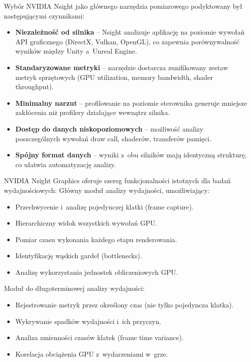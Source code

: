 Wybór NVIDIA Nsight jako głównego narzędzia pomiarowego podyktowany
był następującymi czynnikami:

\begin{itemize}
    \item \textbf{Niezależność od silnika} -- Nsight analizuje aplikację na poziomie wywołań API graficznego (DirectX, Vulkan, OpenGL), co zapewnia porównywalność wyników między Unity a~Unreal Engine.
    \item \textbf{Standaryzowane metryki} -- narzędzie dostarcza zunifikowany zestaw metryk sprzętowych (GPU utilization, memory bandwidth, shader throughput).
    \item \textbf{Minimalny narzut} -- profilowanie na poziomie sterownika generuje mniejsze zakłócenia niż profilery działające wewnątrz silnika.
    \item \textbf{Dostęp do danych niskopoziomowych} -- możliwość analizy poszczególnych wywołań draw call, shaderów, transferów pamięci.
    \item \textbf{Spójny format danych} -- wyniki z~obu silników mają identyczną strukturę, co ułatwia automatyzację analizy.
\end{itemize}


NVIDIA Nsight Graphics oferuje szereg funkcjonalności istotnych dla badań wydajnościowych:
Główny moduł analizy wydajności, umożliwiający:
\begin{itemize}
    \item Przechwycenie i~analizę pojedynczej klatki (frame capture).
    \item Hierarchiczny widok wszystkich wywołań GPU.
    \item Pomiar czasu wykonania każdego etapu renderowania.
    \item Identyfikację wąskich gardeł (bottlenecks).
    \item Analizę wykorzystania jednostek obliczeniowych GPU.
\end{itemize}

Moduł do długoterminowej analizy wydajności:
\begin{itemize}
    \item Rejestrowanie metryk przez określony czas (nie tylko pojedyncza klatka).
    \item Wykrywanie spadków wydajności i~ich przyczyn.
    \item Analiza zmienności czasów klatek (frame time variance).
    \item Korelacja obciążenia GPU z~wydarzeniami w~grze.
\end{itemize}

